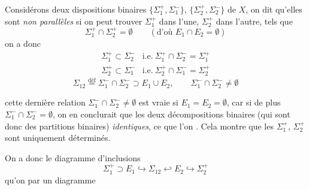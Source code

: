 \documentclass[11pt,a4paper]{article}
\begin{document}
Considérons deux dispositions binaires $\{\Sigma_{1}^{+},\Sigma_{1}^{-}\}$,
$\{\Sigma_{2}^{+},\Sigma_{2}^{-}\}$  de $X$, on dit
qu'elles sont \emph{non parallèles}  si on peut trouver $\Sigma_{1}^{+}$ dans l'une, $\Sigma_{2}^{+}$ dans
l'autre, tels que
\[
  \Sigma_{1}^{+}\cap\Sigma_{2}^{+}=\emptyset\qquad(\text{d'où }E_{1}\cap
  E_{2}=\emptyset)
\]
on a donc
\[
  \begin{array}{ll}
    \Sigma_{1}^{+}\subset\Sigma_{2}^{-} &
    \text{i.e.}\ \Sigma_{1}^{+}\cap\Sigma_{2}^{-}=\Sigma_{1}^{+}\\
    \Sigma_{2}^{+}\subset\Sigma_{1}^{-} &
    \text{i.e.}\ \Sigma_{2}^{+}\cap\Sigma_{1}^{-}=\Sigma_{2}^{+}
  \end{array}
\]
\[
  \Sigma_{12}\overset{\text{déf}}{=}\Sigma_{1}^{-}\cap\Sigma_{2}^{-}\supset
  E_{1}\cup E_{2},\qquad\Sigma_{1}^{-}\cap\Sigma_{2}^{-}\neq\emptyset
\]

cette dernière relation $\Sigma_{1}^{-}\cap\Sigma_{2}^{-}\neq\emptyset$ est
vraie  si $E_{1}=E_{2}=\emptyset$, car \struck{\ill{}} si
 de plus $\Sigma_{1}^{-}\cap\Sigma_{2}^{-}=\emptyset$, on
en conclurait que les deux  décompositions binaires
 (qui sont donc des partitions binaires) 
\emph{identiques}, ce que l'on . Cela montre que les
$\Sigma_{1}^{+}$, $\Sigma_{2}^{+}$ sont uniquement déterminés.

On a donc le diagramme d'inclusions
\[
  \Sigma_{1}^{+}\supset E_{1}\hookrightarrow\Sigma_{12}\hookleftarrow
  E_{2}\hookrightarrow\Sigma_{2}^{+}
\]
qu'on  par un diagramme
\end{document}
